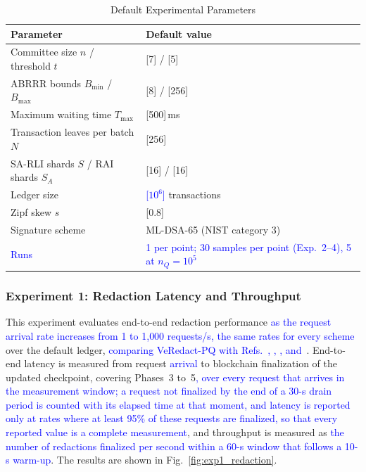 \documentclass[lettersize,journal]{IEEEtran}
\newcommand{\chg}[1]{\textcolor{blue}{#1}}
\begin{document}
    \begin{table}[t]
    \centering
    \caption{Default Experimental Parameters}
    \label{tab:params}
    \scriptsize
    \renewcommand{\arraystretch}{1.08}
    \setlength{\tabcolsep}{4pt}
    \begin{tabular}{ll}
    \hline
    \textbf{Parameter} & \textbf{Default value} \\
    \hline
    Committee size $n$ / threshold $t$ & [7] / [5] \\
    ABRRR bounds $B_{\min}$ / $B_{\max}$ & [8] / [256] \\
    Maximum waiting time $T_{\max}$ & [500]\,ms \\
    Transaction leaves per batch $N$ & [256] \\
    SA-RLI shards $S$ / RAI shards $S_A$ & [16] / [16] \\
    Ledger size & \chg{[$10^6$]} transactions \\
    Zipf skew $s$ & [0.8] \\
    Signature scheme & ML-DSA-65 (NIST category 3) \\
    \chg{Runs} & \chg{1 per point; 30 samples per point (Exp.~2--4), 5 at $n_Q=10^5$} \\
    \hline
    \end{tabular}
    \end{table}

    \subsubsection*{\textbf{Experiment 1: Redaction Latency and Throughput}}

    This experiment evaluates end-to-end redaction performance \chg{as the
    request arrival rate increases from 1 to 1{,}000 requests/s, the same
    rates for every scheme} over the
    default ledger, \chg{comparing VeRedact-PQ with Refs.~\cite{ref1},
    \cite{ref13}, \cite{ref27}, and~\cite{ref34}}. End-to-end latency is
    measured from request \chg{arrival} to blockchain finalization of the
    updated checkpoint, covering Phases~3 to~5\chg{, over every request that
    arrives in the measurement window; a request not finalized by the end of
    a 30-s drain period is counted with its elapsed time at that moment, and
    latency is reported only at rates where at least 95\% of these requests
    are finalized, so that every reported value is a complete measurement},
    and throughput is measured as
    \chg{the number of redactions finalized per second within a 60-s window
    that follows a 10-s warm-up}. The results are shown in
    Fig.~\ref{fig:exp1_redaction}.
\end{document}
